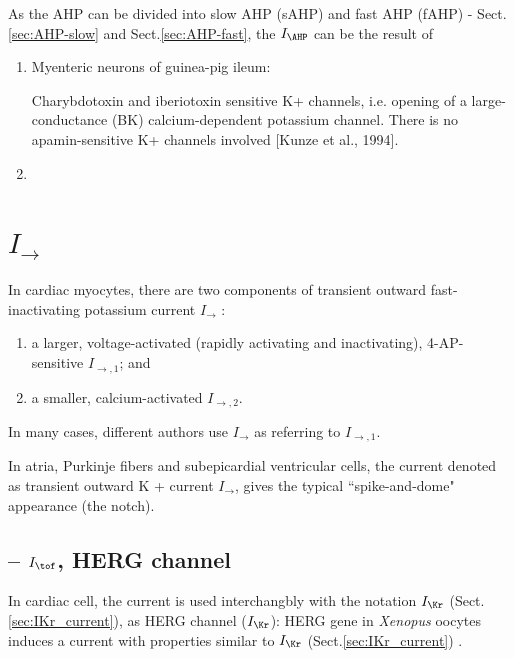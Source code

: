 As the AHP can be divided into slow AHP (sAHP) and fast AHP (fAHP) -
Sect.\ref{sec:AHP-slow}  and Sect.\ref{sec:AHP-fast}, the $I_\AHP$ can be the
result of
\begin{enumerate}
  \item Myenteric neurons of guinea-pig ileum:
  
  Charybdotoxin and iberiotoxin sensitive K+ channels, i.e.
  opening of a large-conductance (BK) calcium-dependent potassium channel.
  There is no apamin-sensitive K+ channels involved [Kunze et al., 1994]. 
  
  \item 
\end{enumerate}

\section{$I_\to$}
\label{sec:Ito1}
\label{sec:Ito2}  
\label{sec:Ito-current}

In cardiac myocytes, there are two components of transient
  outward fast-inactivating potassium current $I_\to$ :
\begin{enumerate}
  \item 
  a larger, voltage-activated (rapidly activating and inactivating),
  4-AP-sensitive $I_{\to,1}$; and
  
  \item a smaller, calcium-activated $I_{\to,2}$. 
\end{enumerate}
In many cases, different authors use  $I_{\to}$ as referring to $I_{\to,1}$.
  
  
  In atria, Purkinje fibers and subepicardial ventricular cells, the current
  denoted as transient outward K + current $I_\to$, gives the typical
  ``spike-and-dome" appearance (the notch).


\subsection{--  $I_\tof$, HERG channel}
\label{sec:Itof_channel}
\label{sec:HERG_channel}

In cardiac cell, the current is used interchangbly with the notation $I_\Kr$
(Sect.\ref{sec:IKr_current}), as HERG channel ($I_\Kr$): HERG gene in {\it
Xenopus} oocytes induces a current with properties similar to $I_\Kr$
(Sect.\ref{sec:IKr_current}) \citep{sanguinetti1995, trudeau1995}.

